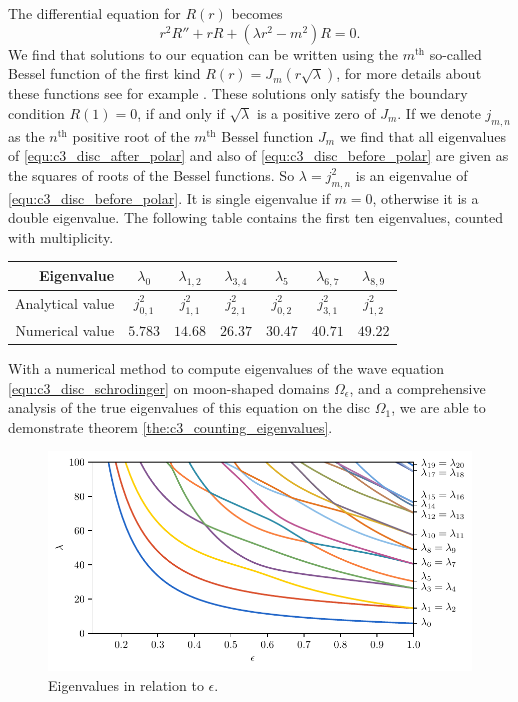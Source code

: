 The differential equation for $R(r)$ becomes
$$
    r^2 R'' + r R + (\lambda r^2 - m^2)R = 0\text{.}
$$
We find that solutions to our equation can be written using the $m^\text{th}$ so-called Bessel function of the first kind $R(r) = J_m(r \sqrt{\lambda})$, for more details about these functions see for example \cite[section~4.7]{asmar_partial_2005}. These solutions only satisfy the boundary condition $R(1) = 0$, if and only if $\sqrt{\lambda}$ is a positive zero of $J_m$. If we denote $j_{m, n}$ as the $n^\text{th}$ positive root of the $m^\text{th}$ Bessel function $J_m$ we find that all eigenvalues of \eqref{equ:c3_disc_after_polar} and also of \eqref{equ:c3_disc_before_polar} are given as the squares of roots of the Bessel functions. So $\lambda = j_{m, n}^2$ is an eigenvalue of \eqref{equ:c3_disc_before_polar}. It is single eigenvalue if $m = 0$, otherwise it is a double eigenvalue. The following table contains the first ten eigenvalues, counted with multiplicity.

\begin{center}
    \bgroup
    \def\arraystretch{1.5}
    \begin{tabular}{r|cccccc}
        Eigenvalue       & $\lambda_0$ & $\lambda_{1,2}$ & $\lambda_{3,4}$ & $\lambda_{5}$ & $\lambda_{6,7}$ & $\lambda_{8,9}$ \\ \hline\hline
        Analytical value & $j_{0,1}^2$ & $j_{1,1}^2$     & $j_{2,1}^2$     & $j_{0,2}^2$   & $j_{3,1}^2$     & $j_{1,2}^2$     \\ \hline
        Numerical value  & $5.783$     & $14.68$         & $26.37$         & $30.47$       & $40.71$         & $49.22$
    \end{tabular}
    \egroup
\end{center}

With a numerical method to compute eigenvalues of the wave equation \eqref{equ:c3_disc_schrodinger} on moon-shaped domains $\Omega_\epsilon$, and a comprehensive analysis of the true eigenvalues of this equation on the disc $\Omega_1$, we are able to demonstrate theorem \ref{the:c3_counting_eigenvalues}.

\begin{figure}
    \begin{center}
        \includegraphics[width=\textwidth]{img/chapter3/on_disc/eigenvalues_flow.pdf}
        \caption{Eigenvalues in relation to $\epsilon$.}
        \label{fig:c3_disc_eigenvalues_flow}
    \end{center}
\end{figure}


